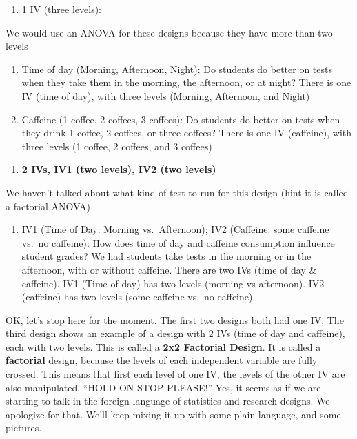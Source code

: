 \documentclass[]{book}
\providecommand{\tightlist}{%
  \setlength{\itemsep}{0pt}\setlength{\parskip}{0pt}}
\begin{document}
\begin{enumerate}
\def\labelenumi{\arabic{enumi}.}
\setcounter{enumi}{1}
\tightlist
\item
  1 IV (three levels):
\end{enumerate}

We would use an ANOVA for these designs because they have more than two levels

\begin{enumerate}
\def\labelenumi{\alph{enumi}.}
\item
  Time of day (Morning, Afternoon, Night): Do students do better on tests when they take them in the morning, the afternoon, or at night? There is one IV (time of day), with three levels (Morning, Afternoon, and Night)
\item
  Caffeine (1 coffee, 2 coffees, 3 coffees): Do students do better on tests when they drink 1 coffee, 2 coffees, or three coffees? There is one IV (caffeine), with three levels (1 coffee, 2 coffees, and 3 coffees)
\end{enumerate}

\begin{enumerate}
\def\labelenumi{\arabic{enumi}.}
\setcounter{enumi}{2}
\tightlist
\item
  \textbf{2 IVs, IV1 (two levels), IV2 (two levels)}
\end{enumerate}

We haven't talked about what kind of test to run for this design (hint it is called a factorial ANOVA)

\begin{enumerate}
\def\labelenumi{\alph{enumi}.}
\tightlist
\item
  IV1 (Time of Day: Morning vs.~Afternoon); IV2 (Caffeine: some caffeine vs.~no caffeine): How does time of day and caffeine consumption influence student grades? We had students take tests in the morning or in the afternoon, with or without caffeine. There are two IVs (time of day \& caffeine). IV1 (Time of day) has two levels (morning vs afternoon). IV2 (caffeine) has two levels (some caffeine vs.~no caffeine)
\end{enumerate}

OK, let's stop here for the moment. The first two designs both had one IV. The third design shows an example of a design with 2 IVs (time of day and caffeine), each with two levels. This is called a \textbf{2x2 Factorial Design}. It is called a \textbf{factorial} design, because the levels of each independent variable are fully crossed. This means that first each level of one IV, the levels of the other IV are also manipulated. ``HOLD ON STOP PLEASE!'' Yes, it seems as if we are starting to talk in the foreign language of statistics and research designs. We apologize for that. We'll keep mixing it up with some plain language, and some pictures.
\end{document}
